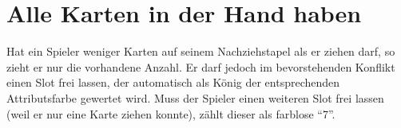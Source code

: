 \section{Alle Karten in der Hand haben}
Hat ein Spieler weniger Karten auf seinem Nachziehstapel als er ziehen darf, so zieht er nur die vorhandene Anzahl. Er darf jedoch im bevorstehenden Konflikt einen Slot frei lassen, der automatisch als König der entsprechenden Attributsfarbe gewertet wird. Muss der Spieler einen weiteren Slot frei lassen (weil er nur eine Karte ziehen konnte), zählt dieser als farblose "`7"'.
